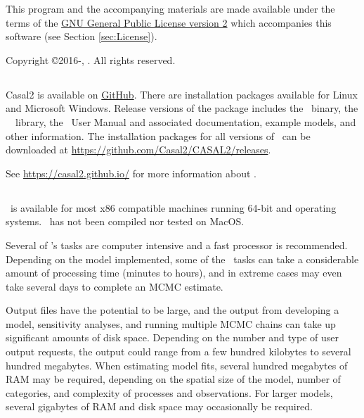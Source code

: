 This program and the accompanying materials are made available under the terms of the \href{http://www.opensource.org/licenses/GPL-2.0}{GNU General Public License version 2} which accompanies this software (see Section \ref{sec:License}).

Copyright \copyright 2016-\SourceControlYearDoc, \href{https://casal2.github.io/}{\Organisation}. All rights reserved.

\subsection{}

Casal2 is available on \href{https://github.com/Casal2}{GitHub}. There are installation packages available for Linux and Microsoft Windows. Release versions of the package includes the \CNAME\ binary, the \CNAME\ \R\ library, the \CNAME\ User Manual and associated documentation, example models, and other information. The installation packages for all versions of \CNAME\ can be downloaded at \url{https://github.com/Casal2/CASAL2/releases}.  

See \url{https://casal2.github.io/} for more information about \CNAME.

\subsection{}

\CNAME\ is available for most x86 compatible machines running 64-bit  and  operating systems. \CNAME\ has not been compiled nor tested on MacOS.

Several of \CNAME's tasks are computer intensive and a fast processor is recommended. Depending on the model implemented, some of the \CNAME\ tasks can take a considerable amount of processing time (minutes to hours), and in extreme cases may even take several days to complete an MCMC estimate.

Output files have the potential to be large, and the output from developing a model, sensitivity analyses, and running multiple MCMC chains can take up significant amounts of disk space. Depending on the number and type of user output requests, the output could range from a few hundred kilobytes to several hundred megabytes. When estimating model fits, several hundred megabytes of RAM may be required, depending on the spatial size of the model, number of categories, and complexity of processes and observations. For larger models, several gigabytes of RAM and disk space may occasionally be required.

